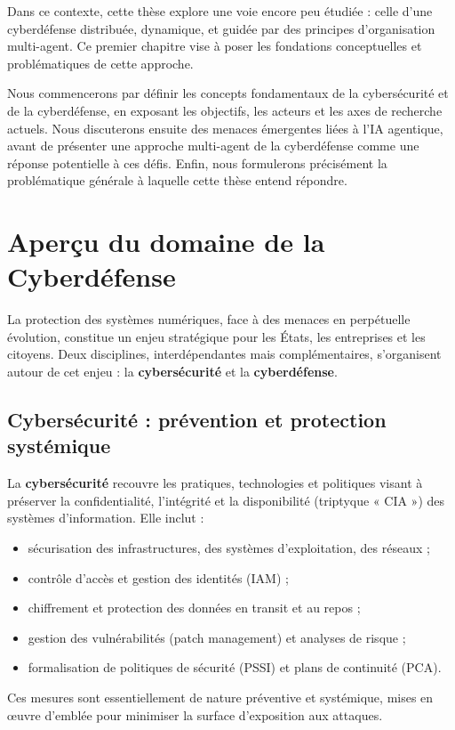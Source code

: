 \documentclass[ twoside,openright,titlepage,numbers=noenddot,headinclude,%
                footinclude=true,cleardoublepage=empty,abstractoff, %
                BCOR=5mm,paper=a4,fontsize=11pt,%
                french,american,%
                ]{scrreprt}
\begin{document}
Dans ce contexte, cette thèse explore une voie encore peu étudiée : celle d'une cyberdéfense distribuée, dynamique, et guidée par des principes d'organisation multi-agent. Ce premier chapitre vise à poser les fondations conceptuelles et problématiques de cette approche.

Nous commencerons par définir les concepts fondamentaux de la cybersécurité et de la cyberdéfense, en exposant les objectifs, les acteurs et les axes de recherche actuels. Nous discuterons ensuite des menaces émergentes liées à l'IA agentique, avant de présenter une approche multi-agent de la cyberdéfense comme une réponse potentielle à ces défis. Enfin, nous formulerons précisément la problématique générale à laquelle cette thèse entend répondre.

\section{Aperçu du domaine de la Cyberdéfense}\label{sec:cyberdef-panorama}


La protection des systèmes numériques, face à des menaces en perpétuelle évolution, constitue un enjeu stratégique pour les États, les entreprises et les citoyens. Deux disciplines, interdépendantes mais complémentaires, s'organisent autour de cet enjeu : la \textbf{cybersécurité} et la \textbf{cyberdéfense}.

\subsection*{Cybersécurité : prévention et protection systémique}

La \textbf{cybersécurité} recouvre les pratiques, technologies et politiques visant à préserver la confidentialité, l'intégrité et la disponibilité (triptyque « CIA ») des systèmes d'information. Elle inclut :
\begin{itemize}
    \item sécurisation des infrastructures, des systèmes d'exploitation, des réseaux ;
    \item contrôle d'accès et gestion des identités (IAM) ;
    \item chiffrement et protection des données en transit et au repos ;
    \item gestion des vulnérabilités (patch management) et analyses de risque ;
    \item formalisation de politiques de sécurité (PSSI) et plans de continuité (PCA).
\end{itemize}
Ces mesures sont essentiellement de nature préventive et systémique, mises en œuvre d'emblée pour minimiser la surface d'exposition aux attaques.
\end{document}
